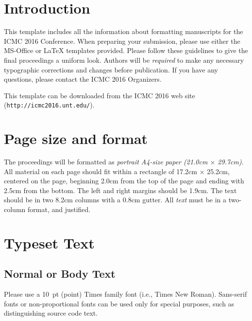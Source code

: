 \documentclass{article}
\title{\papertitle}
\begin{document}
%
\capstartfalse
\maketitle
\capstarttrue
%
\begin{abstract}
The abstract should be placed at the start of the top left column and should contain about 150-200 words. The abstract should be formatted in italic type (this has already been set in the abstract style).
\end{abstract}
%

\section{Introduction}\label{sec:introduction}
This template includes all the information about formatting manuscripts for the ICMC 2016 Conference. When preparing your submission, please use either the MS-Office or LaTeX templates provided. Please follow these guidelines to give the final proceedings a uniform look. Authors will be {\em required} to make any necessary typographic corrections and changes before publication. If you have any questions, please contact the ICMC 2016 Organizers.

This template can be downloaded from the ICMC 2016 web site (\texttt{http://icmc2016.unt.edu/}).

\section{Page size and format}\label{sec:page_size}
The proceedings will be formatted as {\em portrait A4-size paper (21.0cm $\times$ 29.7cm)}. All material on each page should fit within a rectangle of 17.2cm $\times$ 25.2cm, centered on the page, beginning 2.0cm from the top of the page and ending with 2.5cm from the bottom. The left and right margins should be 1.9cm. The text should be in two 8.2cm columns with a 0.8cm gutter. All {\em text} must be in a two-column format, and justified.

\section{Typeset Text}\label{sec:typeset_text}

\subsection{Normal or Body Text}\label{subsec:body}
Please use a 10~pt (point) Times family font (i.e., Times New Roman). Sans-serif fonts or non-proportional fonts can be used only for special purposes, such as distinguishing source code text.
\end{document}
